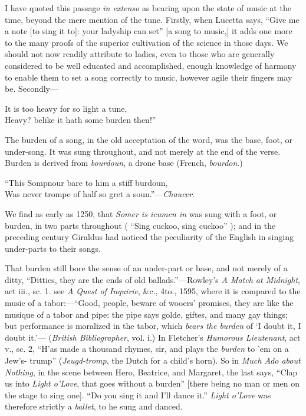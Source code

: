 I have quoted this passage \textit{in extenso} as bearing upon the state of music at the
time, beyond the mere mention of the tune. Firstly, when Lucetta says, “Give
me a note [to sing it to]: your ladyship can set” [a song to music,] it adds one
more to the many proofs of the superior cultivation of the science in those days.
We should not now readily attribute to ladies, even to those who are generally
considered to be well educated and \pagebreak accomplished, enough knowledge of
harmony to enable them to set a song correctly to music, however agile their
fingers may be. Secondly—
\settowidth{\versewidth}{Heavy? belike it hath some burden then!}
\begin{scverse}
It is too heavy for so light a tune,\\
Heavy? belike it hath some burden then!”
\end{scverse}

The burden of a song, in the old acceptation of the word, was the base, foot, or
under-song. It was sung throughout, and not merely at the end of the verse.
Burden is derived from \textit{bourdoun}, a drone base (French, \textit{bourdon}.)

\begin{scverse}
“This Sompnour bare to him a stiff burdoun,\\
Was never trompe of half so gret a soun.”—\textit{Chaucer}.
\end{scverse}

We find as early as 1250, that \textit{Somer is icumen in} was sung with a foot, or burden,
in two parts throughout ( “Sing cuckoo, sing cuckoo” ); and in the preceding
century Giraldus had noticed the peculiarity of the English in singing under-parts
to their songs.


That burden still bore the sense of an under-part or base, and not merely of a
ditty,\scfootnote
{“Ditties, they are the ends of old ballads.”—Rowley’s \textit{A Match at Midnight}, act iii., sc. 1.}
 see \textit{A Quest of Inquirie}, \&c., 4to., 1595, where it is compared to the music
of a tabor:—“Good, people, beware of wooers’ promises, they are like the musique
of a tabor and pipe: the pipe says golde, giftes, and many gay things; but performance
is moralized in the tabor, which \textit{bears the burden} of ‘I doubt it, I doubt it.’—
(\textit{British Bibliographer}, vol. i.) In Fletcher’s \textit{Humorous Lieutenant}, act v., sc. 2,
“H’as made a thousand rhymes, sir, and plays the \textit{burden} to 'em on a Jew’s-
trump” (\textit{Jeugd-tromp}, the Dutch for a child’s horn). So in \textit{Much Ado about
Nothing}, in the scene between Hero, Beatrice, and Margaret, the last says, “Clap
us into \textit{Light o'Love}, that goes without a burden” [there being no man or men
on the stage to sing one]. “Do you sing it and I’ll dance it.” \textit{Light o'Love}
was therefore strictly a \textit{ballet}, to he sung and danced.

